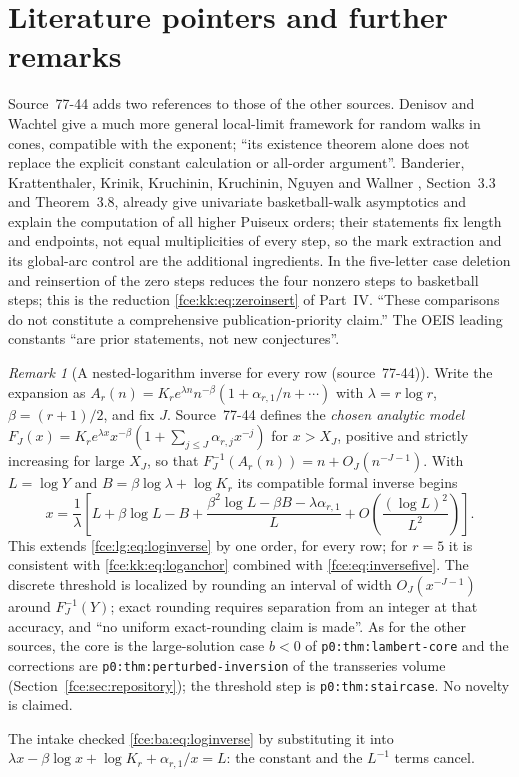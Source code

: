 \documentclass[11pt,a4paper]{article}
\numberwithin{equation}{section}
\theoremstyle{definition}\newtheorem{definition}[theorem]{Definition}
\theoremstyle{remark}\newtheorem{remark}[theorem]{Remark}
\begin{document}
\section{Literature pointers and further remarks}\label{fce:ba:sec:literature}
Source~77-44 adds two references to those of the other sources. Denisov and
Wachtel \cite{dw} give a much more general local-limit framework for random
walks in cones, compatible with the exponent; ``its existence theorem alone
does not replace the explicit constant calculation or all-order argument''.
Banderier, Krattenthaler, Krinik, Kruchinin, Kruchinin, Nguyen and Wallner
\cite{basketball}, Section~3.3 and Theorem~3.8, already give univariate
basketball-walk asymptotics and explain the computation of all higher
Puiseux orders; their statements fix length and endpoints, not equal
multiplicities of every step, so the mark extraction and its global-arc
control are the additional ingredients. In the five-letter case deletion and
reinsertion of the zero steps reduces the four nonzero steps to basketball
steps; this is the reduction \eqref{fce:kk:eq:zeroinsert} of Part~IV.
``These comparisons do not constitute a comprehensive publication-priority
claim.'' The OEIS leading constants ``are prior statements, not new
conjectures''.

\begin{remark}[A nested-logarithm inverse for every row (source~77-44)]\label{fce:ba:rem:inverse}
Write the expansion as $A_r(n)=K_re^{\lambda n}n^{-\beta}(1+\alpha_{r,1}/n+\cdots)$
with $\lambda=r\log r$, $\beta=(r+1)/2$, and fix $J$. Source~77-44 defines
the \emph{chosen analytic model}
$F_J(x)=K_re^{\lambda x}x^{-\beta}(1+\sum_{j\le J}\alpha_{r,j}x^{-j})$ for
$x>X_J$, positive and strictly increasing for large $X_J$, so that
$F_J^{-1}(A_r(n))=n+O_J(n^{-J-1})$. With $L=\log Y$ and
$B=\beta\log\lambda+\log K_r$ its compatible formal inverse begins
\begin{equation}\label{fce:ba:eq:loginverse}
 x=\frac1\lambda\left[L+\beta\log L-B
 +\frac{\beta^2\log L-\beta B-\lambda\alpha_{r,1}}{L}
 +O\!\left(\frac{(\log L)^2}{L^2}\right)\right].
\end{equation}
This extends \eqref{fce:lg:eq:loginverse} by one order, for every row; for
$r=5$ it is consistent with \eqref{fce:kk:eq:loganchor} combined with
\eqref{fce:eq:inversefive}. The discrete threshold is localized by rounding
an interval of width $O_J(x^{-J-1})$ around $F_J^{-1}(Y)$; exact rounding
requires separation from an integer at that accuracy, and ``no uniform
exact-rounding claim is made''. As for the other sources, the core is the
large-solution case $b<0$ of \texttt{p0:thm:lambert-core} and the
corrections are \texttt{p0:thm:perturbed-inversion} of the transseries
volume (Section~\ref{fce:sec:repository}); the threshold step is
\texttt{p0:thm:staircase}. No novelty is claimed.
\end{remark}
The intake checked \eqref{fce:ba:eq:loginverse} by substituting it into
$\lambda x-\beta\log x+\log K_r+\alpha_{r,1}/x=L$: the constant and the
$L^{-1}$ terms cancel.
\end{document}

